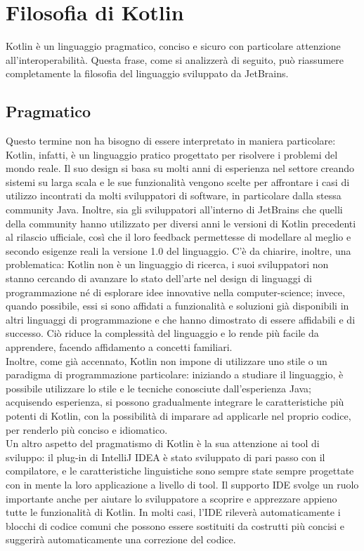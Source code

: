 \section{Filosofia di Kotlin}
Kotlin è un linguaggio pragmatico, conciso e sicuro con particolare attenzione all'interoperabilità. Questa frase, come si analizzerà di seguito, può riassumere completamente la filosofia del linguaggio sviluppato da JetBrains.\\

\subsection{Pragmatico}

Questo termine non ha bisogno di essere interpretato in maniera particolare: Kotlin, infatti, è un linguaggio pratico progettato per risolvere i problemi del mondo reale. Il suo design si basa su molti anni di esperienza nel settore creando sistemi su larga scala e le sue funzionalità vengono scelte per affrontare i casi di utilizzo incontrati da molti sviluppatori di software, in particolare dalla stessa community Java. Inoltre, sia gli sviluppatori all'interno di JetBrains che quelli della community hanno utilizzato per diversi anni le versioni di Kotlin precedenti al rilascio ufficiale, così che il loro feedback permettesse di modellare al meglio e secondo esigenze reali la versione 1.0 del linguaggio. C’è da chiarire, inoltre, una problematica: Kotlin non è un linguaggio di ricerca, i suoi sviluppatori non stanno cercando di avanzare lo stato dell'arte nel design di linguaggi di programmazione né di esplorare idee innovative nella computer-science; invece, quando possibile, essi si sono affidati a funzionalità e soluzioni già disponibili in altri linguaggi di programmazione e che hanno dimostrato di essere affidabili e di successo. Ciò riduce la complessità del linguaggio e lo rende più facile da apprendere, facendo affidamento a concetti familiari.\\
Inoltre, come già accennato, Kotlin non impone di utilizzare uno stile o un paradigma di programmazione particolare: iniziando a studiare il linguaggio, è possibile utilizzare lo stile e le tecniche conosciute dall'esperienza Java; acquisendo esperienza, si possono gradualmente integrare le caratteristiche più potenti di Kotlin, con la possibilità di imparare ad applicarle nel proprio codice, per renderlo più conciso e idiomatico.\\
Un altro aspetto del pragmatismo di Kotlin è la sua attenzione ai tool di sviluppo: il plug-in di IntelliJ IDEA è stato sviluppato di pari passo con il compilatore, e le caratteristiche linguistiche sono sempre state sempre progettate con in mente la loro applicazione a livello di tool. Il supporto IDE svolge un ruolo importante anche per aiutare lo sviluppatore a scoprire e apprezzare appieno tutte le funzionalità di Kotlin. In molti casi, l’IDE rileverà automaticamente i blocchi di codice comuni che possono essere sostituiti da costrutti più concisi e suggerirà automaticamente una correzione del codice.\\

